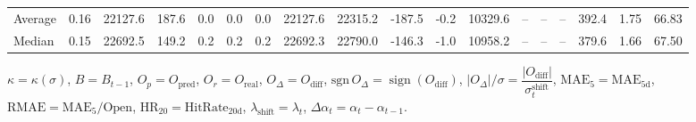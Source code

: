 \begin{threeparttable}
{\begin{tabular}{lrrrrrrrrrrrrrrrrr}
Average &     0.16 & 22127.6 &             187.6 &               0.0 &                0.0 &                0.0 & 22127.6 & 22315.2 &     -187.5 &                     -0.2 &             10329.6 &         -- &        -- &             -- &            392.4 &            1.75 &                  66.83 \\
 Median &     0.15 & 22692.5 &             149.2 &               0.2 &                0.2 &                0.2 & 22692.3 & 22790.0 &     -146.3 &                     -1.0 &             10958.2 &         -- &        -- &             -- &            379.6 &            1.66 &                  67.50 \\
\bottomrule
\end{tabular}
}
\begin{tablenotes}\footnotesize
\item $\kappa=\kappa(\sigma)$, $B=B_{t-1}$, $O_p=O_{\text{pred}}$, $O_r=O_{\text{real}}$, $O_\Delta=O_{\text{diff}}$, $\mathrm{sgn}\,O_\Delta=\operatorname{sign}(O_{\text{diff}})$, $|O_\Delta|/\sigma=\dfrac{|O_{\text{diff}}|}{\sigma_t^{\text{shift}}}$, $\mathrm{MAE}_5=\mathrm{MAE}_{5\text{d}}$, $\mathrm{RMAE}= \mathrm{MAE}_5 / \text{Open}$, $\mathrm{HR}_{20}=\mathrm{HitRate}_{20\text{d}}$, 
$\lambda_{\text{shift}}=\lambda_t$, 
$\Delta\alpha_t=\alpha_t-\alpha_{t-1}$.
\end{tablenotes}
\end{threeparttable}
\endgroup

